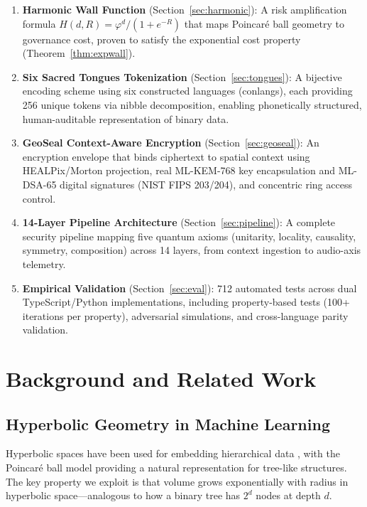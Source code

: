 \documentclass[11pt,a4paper]{article}
\newcommand{\golden}{\varphi}
\begin{document}
\begin{enumerate}
  \item \textbf{Harmonic Wall Function} (Section~\ref{sec:harmonic}):
    A risk amplification formula $H(d, R) = \golden^d / (1 + e^{-R})$
    that maps Poincar\'{e} ball geometry to governance cost, proven to
    satisfy the exponential cost property (Theorem~\ref{thm:expwall}).

  \item \textbf{Six Sacred Tongues Tokenization} (Section~\ref{sec:tongues}):
    A bijective encoding scheme using six constructed languages (conlangs),
    each providing 256 unique tokens via nibble decomposition, enabling
    phonetically structured, human-auditable representation of binary data.

  \item \textbf{GeoSeal Context-Aware Encryption} (Section~\ref{sec:geoseal}):
    An encryption envelope that binds ciphertext to spatial context using
    HEALPix/Morton projection, real ML-KEM-768 key encapsulation and
    ML-DSA-65 digital signatures (NIST FIPS 203/204), and concentric
    ring access control.

  \item \textbf{14-Layer Pipeline Architecture} (Section~\ref{sec:pipeline}):
    A complete security pipeline mapping five quantum axioms (unitarity,
    locality, causality, symmetry, composition) across 14 layers, from
    context ingestion to audio-axis telemetry.

  \item \textbf{Empirical Validation} (Section~\ref{sec:eval}):
    712 automated tests across dual TypeScript/Python implementations,
    including property-based tests (100+ iterations per property),
    adversarial simulations, and cross-language parity validation.
\end{enumerate}

\section{Background and Related Work}
\label{sec:related}

\subsection{Hyperbolic Geometry in Machine Learning}

Hyperbolic spaces have been used for embedding hierarchical data
\cite{nickel2017poincare, nickel2018learning}, with the Poincar\'{e}
ball model providing a natural representation for tree-like structures.
The key property we exploit is that volume grows exponentially with
radius in hyperbolic space---analogous to how a binary tree has
$2^d$ nodes at depth $d$.
\end{document}
